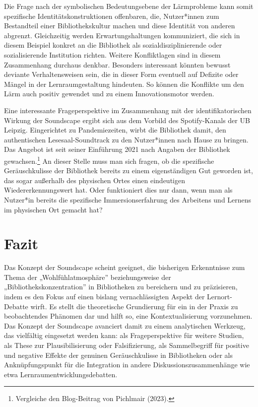 \documentclass[a4paper,
fontsize=11pt,
oneside,
numbers=noperiodatend,
parskip=half-,
bibliography=totoc,
final
]{scrartcl}
\begin{document}
Die Frage nach der symbolischen Bedeutungsebene der Lärmprobleme kann
somit spezifische Identitätskonstruktionen offenbaren, die, Nutzer*innen
zum Bestandteil einer Bibliothekskultur machen und diese Identität von
anderen abgrenzt. Gleichzeitig werden Erwartungshaltungen kommuniziert,
die sich in diesem Beispiel konkret an die Bibliothek als
sozialdisziplinierende oder sozialisierende Institution richten. Weitere
Konfliktlagen sind in diesem Zusammenhang durchaus denkbar. Besonders
interessant könnten bewusst deviante Verhaltensweisen sein, die in
dieser Form eventuell auf Defizite oder Mängel in der Lernraumgestaltung
hindeuten. So können die Konflikte um den Lärm auch positiv gewendet und
zu einem Innovationsmotor werden.

Eine interessante Frageperspektive im Zusammenhang mit der
identifikatorischen Wirkung der Soundscape ergibt sich aus dem Vorbild
des Spotify-Kanals der UB Leipzig. Eingerichtet zu Pandemiezeiten, wirbt
die Bibliothek damit, den authentischen Lesesaal-Soundtrack zu den
Nutzer*innen nach Hause zu bringen. Das Angebot ist seit seiner
Einführung 2021 nach Angaben der Bibliothek gewachsen.\footnote{Vergleiche
  den Blog-Beitrag von Pichlmair (2023).} An dieser Stelle muss man sich
fragen, ob die spezifische Geräuschkulisse der Bibliothek bereits zu
einem eigenständigen Gut geworden ist, das sogar außerhalb des
physischen Ortes einen eindeutigen Wiedererkennungswert hat. Oder
funktioniert dies nur dann, wenn man als Nutzer*in bereits die
spezifische Immersionserfahrung des Arbeitens und Lernens im physischen
Ort gemacht hat?

\hypertarget{fazit}{%
\section{Fazit}\label{fazit}}

Das Konzept der Soundscape scheint geeignet, die bisherigen Erkenntnisse
zum Thema der „Wohlfühlatmosphäre'' beziehungsweise der
„Bibliothekskonzentration'' in Bibliotheken zu bereichern und zu
präzisieren, indem es den Fokus auf einen bislang vernachlässigten
Aspekt der Lernort-Debatte wirft. Es stellt die theoretische Grundierung
für ein in der Praxis zu beobachtendes Phänomen dar und hilft so, eine
Kontextualisierung vorzunehmen. Das Konzept der Soundscape avanciert
damit zu einem analytischen Werkzeug, das vielfältig eingesetzt werden
kann: als Frageperspektive für weitere Studien, als These zur
Plausibilisierung oder Falsifizierung, als Sammelbegriff für positive
und negative Effekte der genuinen Geräuschkulisse in Bibliotheken oder als
Anknüpfungspunkt für die Integration in andere Diskussionszusammenhänge
wie etwa Lernraumentwicklungsdebatten.
\end{document}
